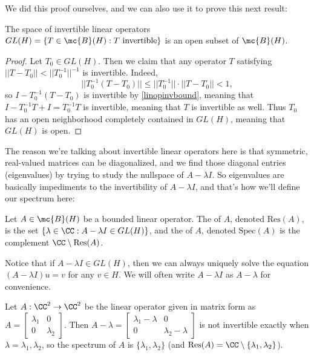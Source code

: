 We did this proof ourselves, and we can also use it to prove this next result:

\begin{proposition}
The space of invertible linear operators $GL(H) = \{T \in \mc{B}(H): T \text{ invertible}\}$ is an open subset of $\mc{B}(H)$.
\end{proposition}
\begin{proof}
Let $T_0 \in GL(H)$. Then we claim that any operator $T$ satisfying $||T - T_0|| < ||T_0^{-1}||^{-1}$ is invertible. Indeed,
\[
    ||T_0^{-1}(T - T_0)|| \le ||T_0^{-1}|| \cdot ||T - T_0|| < 1,
\]
so $I - T_0^{-1}(T-T_0)$ is invertible by \cref{linopinvbound}, meaning that $I - T_0^{-1}T + I = T_0^{-1}T$ is invertible, meaning that $T$ is invertible as well. Thus $T_0$ has an open neighborhood completely contained in $GL(H)$, meaning that $GL(H)$ is open.
\end{proof}

The reason we're talking about invertible linear operators here is that symmetric, real-valued matrices can be diagonalized, and we find those diagonal entries (eigenvalues) by trying to study the nullspace of $A - \lambda I$. So eigenvalues are basically impediments to the invertibility of $A - \lambda I$, and that's how we'll define our spectrum here:

\begin{definition}
Let $A \in \mc{B}(H)$ be a bounded linear operator. The  of $A$, denoted $\text{Res}(A)$, is the set $\{\lambda \in \CC: A - \lambda I \in GL(H)\}$, and the  of $A$, denoted $\text{Spec}(A)$ is the complement $\CC \setminus \text{Res}(A)$.
\end{definition}

Notice that if $A - \lambda I \in GL(H)$, then we can always uniquely solve the equation $(A - \lambda I) u = v$ for any $v \in H$. We will often write $A - \lambda I$ as $A - \lambda$ for convenience. 

\begin{example}
Let $A: \CC^2 \to \CC^2$ be the linear operator given in matrix form as $A = \begin{bmatrix} \lambda_1 & 0 \\ 0 & \lambda_2 \end{bmatrix}$. Then $A - \lambda = \begin{bmatrix} \lambda_1 - \lambda & 0 \\ 0 & \lambda_2 - \lambda \end{bmatrix}$ is not invertible exactly when $\lambda = \lambda_1, \lambda_2$, so the spectrum of $A$ is $\{\lambda_1, \lambda_2\}$ (and $\text{Res}(A) = \CC \setminus \{\lambda_1, \lambda_2\}$).
\end{example}

